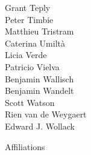 \documentclass[PICOReport.tex]{subfiles}
\begin{document}
{\begin{multicols}{4}
Grant Teply                     \\
Peter Timbie                    \\
Matthieu Tristram               \\
Caterina Umilt\`{a}             \\
Licia Verde                     \\
Patricio Vielva                 \\
Benjamin Wallisch               \\
Benjamin Wandelt                \\
Scott Watson                    \\
Rien van de Weygaert            \\
Edward J. Wollack               
\end{multicols}
}


\newpage
\Large  {\centerline {Affiliations}}
\end{document}

